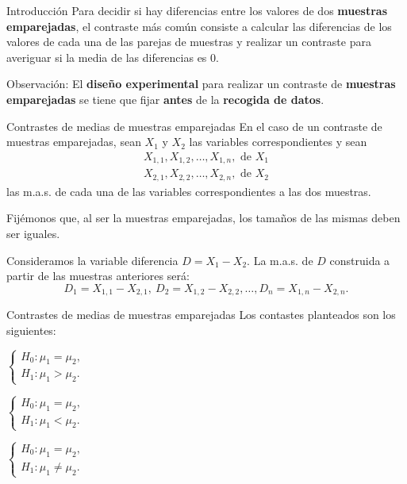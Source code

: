 \documentclass[
  ignorenonframetext,
]{beamer}
\begin{document}
\begin{frame}{Introducción}
\protect\hypertarget{introducciuxf3n-3}{}
Para decidir si hay diferencias entre los valores de dos
\textbf{muestras emparejadas}, el contraste más común consiste a
calcular las diferencias de los valores de cada una de las parejas de
muestras y realizar un contraste para averiguar si la media de las
diferencias es 0.

Observación: El \textbf{diseño experimental} para realizar un contraste
de \textbf{muestras emparejadas} se tiene que fijar \textbf{antes} de la
\textbf{recogida de datos}.
\end{frame}

\begin{frame}{Contrastes de medias de muestras emparejadas}
\protect\hypertarget{contrastes-de-medias-de-muestras-emparejadas}{}
En el caso de un contraste de muestras emparejadas, sean \(X_1\) y
\(X_2\) las variables correspondientes y sean \[
\begin{array}{l}
X_{1,1}, X_{1,2},\ldots, X_{1,n},\mbox{ de }X_1\\
X_{2,1}, X_{2,2},\ldots, X_{2,n},\mbox{ de }X_2
\end{array}
\] las m.a.s. de cada una de las variables correspondientes a las dos
muestras.

Fijémonos que, al ser la muestras emparejadas, los tamaños de las mismas
deben ser iguales.

Consideramos la variable diferencia \(D=X_1-X_2\). La m.a.s. de \(D\)
construida a partir de las muestras anteriores será: \[
D_1 =X_{1,1}-X_{2,1}, \ D_2=X_{1,2}-X_{2,2},\ldots, D_n=X_{1,n}-X_{2,n}.
\]
\end{frame}

\begin{frame}{Contrastes de medias de muestras emparejadas}
\protect\hypertarget{contrastes-de-medias-de-muestras-emparejadas-1}{}
Los contastes planteados son los siguientes:

\(\left\{\begin{array}{l} H_0:\mu_1=\mu_2,\\ H_1:\mu_1> \mu_2. \end{array}\right.\)

\(\left\{\begin{array}{l} H_0:\mu_1=\mu_2,\\ H_1:\mu_1< \mu_2. \end{array}\right.\)

\(\left\{\begin{array}{l} H_0:\mu_1=\mu_2,\\ H_1:\mu_1\neq \mu_2. \end{array}\right.\)
\end{frame}
\end{document}
